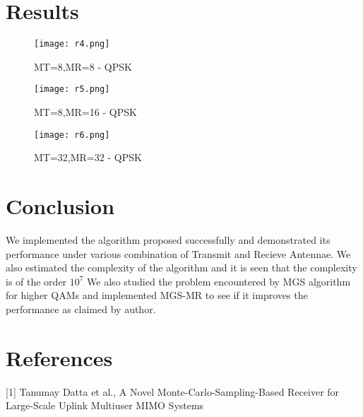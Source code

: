 \documentclass{article}
\begin{document}
\section*{Results}
\begin{figure}[H]
\centering
\texttt{[image: r4.png]}
\caption{MT=8,MR=8 - QPSK}
\label{fig5:Stalling Problem}
\end{figure}
\begin{figure}[H]
\centering
\texttt{[image: r5.png]}
\caption{MT=8,MR=16 - QPSK}
\label{fig6:Stalling Problem}
\end{figure}
\begin{figure}[H]
\centering
\texttt{[image: r6.png]}
\caption{MT=32,MR=32 - QPSK}
\label{fig7:Stalling Problem}
\end{figure}

\section*{Conclusion}
We implemented the algorithm proposed successfully and demonstrated its performance
under various combination of Transmit and Recieve Antennae. We also estimated the
complexity of the algorithm and it is seen that the complexity is of the order $10^7$
We also studied the problem encountered by MGS algorithm for higher QAMs and 
implemented MGS-MR to see if it improves the performance as claimed by author.\\
\section*{References}
[1] Tanumay Datta et al., A Novel Monte-Carlo-Sampling-Based Receiver 
for Large-Scale Uplink Multiuser MIMO Systems \\
\end{document}
